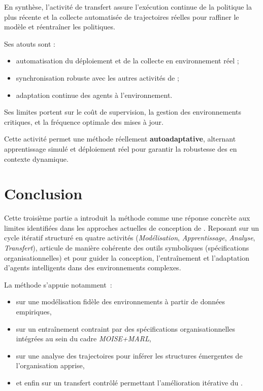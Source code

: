 En synthèse, l'activité de transfert assure l'exécution continue de la politique la plus récente et la collecte automatisée de trajectoires réelles pour raffiner le modèle et réentraîner les politiques.

Ses atouts sont :
\begin{itemize}
  \item automatisation du déploiement et de la collecte en environnement réel ;
  \item synchronisation robuste avec les autres activités de  ;
  \item adaptation continue des agents à l'environnement.
\end{itemize}

Ses limites portent sur le coût de supervision, la gestion des environnements critiques, et la fréquence optimale des mises à jour.

Cette activité permet une méthode réellement \textbf{autoadaptative}, alternant apprentissage simulé et déploiement réel pour garantir la robustesse des  en contexte dynamique.



\clearpage
\thispagestyle{empty}
\null
\newpage

\chapter*{Conclusion}

\noindent
Cette troisième partie a introduit la méthode \textbf{} comme une réponse concrète aux limites identifiées dans les approches actuelles de conception de . Reposant sur un cycle itératif structuré en quatre activités (\textit{Modélisation}, \textit{Apprentissage}, \textit{Analyse}, \textit{Transfert}),  articule de manière cohérente des outils symboliques (spécifications organisationnelles) et  pour guider la conception, l'entraînement et l'adaptation d'agents intelligents dans des environnements complexes.

\medskip

\noindent
La méthode s'appuie notamment~:
\begin{itemize}
  \item sur une modélisation fidèle des environnements à partir de données empiriques,
  \item sur un entraînement contraint par des spécifications organisationnelles intégrées au sein du cadre \textit{MOISE+MARL},
  \item sur une analyse des trajectoires pour inférer les structures émergentes de l'organisation apprise,
  \item et enfin sur un transfert contrôlé permettant l'amélioration itérative du .
\end{itemize}

